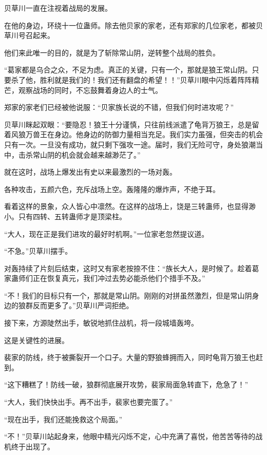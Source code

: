 
\begin{this_body}



贝草川一直在注视着战局的发展。

在他的身边，环绕十一位蛊师。除去他贝家的家老，还有郑家的几位家老，都被贝草川号召起来。

他们来此唯一的目的，就是为了斩除常山阴，逆转整个战局的胜负。

“葛家都是乌合之众，不足为虑。真正的关键，只有一个，那就是狼王常山阴。只要杀了他，胜利就是我们的！我们还有翻盘的希望！！”贝草川眼中闪烁着阵阵精芒，观察战场的同时，不忘鼓舞着身边人的士气。

郑家的家老们已经被他说服：“贝家族长说的不错，但我们何时进攻呢？”

贝草川眯起双眼：“要隐忍！狼王十分谨慎，只往前线派遣了龟背万狼王，总是留着风狼万兽王在身边。他身边的防御力量相当充足。我们实力虽强，但突击的机会只有一次。一旦没有成功，就只剩下强攻一途。届时，我们无险可守，身处狼潮当中，击杀常山阴的机会就会越来越渺茫了。”

就在这时，战场上爆发出有史以来最激烈的一场对轰。

各种攻击，五颜六色，充斥战场上空。轰隆隆的爆炸声，不绝于耳。

看着这样的景象，众人皆心中凛然。在这样的战场上，饶是三转蛊师，也显得渺小。只有四转、五转蛊师才是顶梁柱。

“大人，现在正是我们进攻的最好时机啊。”一位家老忽然提议道。

“不急。”贝草川摆手。

对轰持续了片刻后结束，这时又有家老按捺不住：“族长大人，是时候了。趁着葛家蛊师们正在恢复真元，我们冲过去势必能杀他们个措手不及。”

“不！我们的目标只有一个，那就是常山阴。刚刚的对拼虽然激烈，但是常山阴身边的狼群反而更多了。”贝草川严词拒绝。

接下来，方源陡然出手，敏锐地抓住战机，将一段城墙轰垮。

这是关键性的进展。

裴家的防线，终于被撕裂开一个口子。大量的野狼蜂拥而入，同时龟背万狼王也赶到。

“这下糟糕了！防线一破，狼群彻底展开攻势，裴家局面急转直下，危急了！”

“大人，我们快快出手。再不出手，裴家也要完蛋了。”

“现在出手，我们还能挽救这个局面。”

“不！”贝草川站起身来，他眼中精光闪烁不定，心中充满了喜悦，他苦苦等待的战机终于出现了。


\end{this_body}
